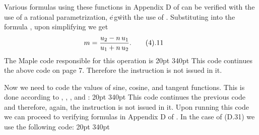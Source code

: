 Various formulas using these functions in Appendix D of  can be 
verified with the use of a rational parametrization, e\.\,g\. with the
use of . Substituting  into the formula
, upon simplifying we get
$$
\hskip -2em
m=\frac{u_2-n\,u_1}{u_1+n\,u_2}.
\mytag{4.11}
$$
The Maple code responsible for this operation is
\medskip
{} 20pt 340pt
\noindent
{}
\medskip
\noindent This code continues the above code on page 7. Therefore the 
 instruction is not issued in it.\par
     Now we need to code the values of sine, cosine, and tangent functions. This is 
done according to , , , and :
\medskip
{} 20pt 340pt
\noindent
{}
\medskip
\noindent This code continues the previous code and therefore, again, the 
 instruction is not issued in it. Upon running this 
code we can proceed to verifying formulas in Appendix D of .
In the case of (D.31) we use the following code:
\medskip
{} 20pt 340pt
\noindent
{}
